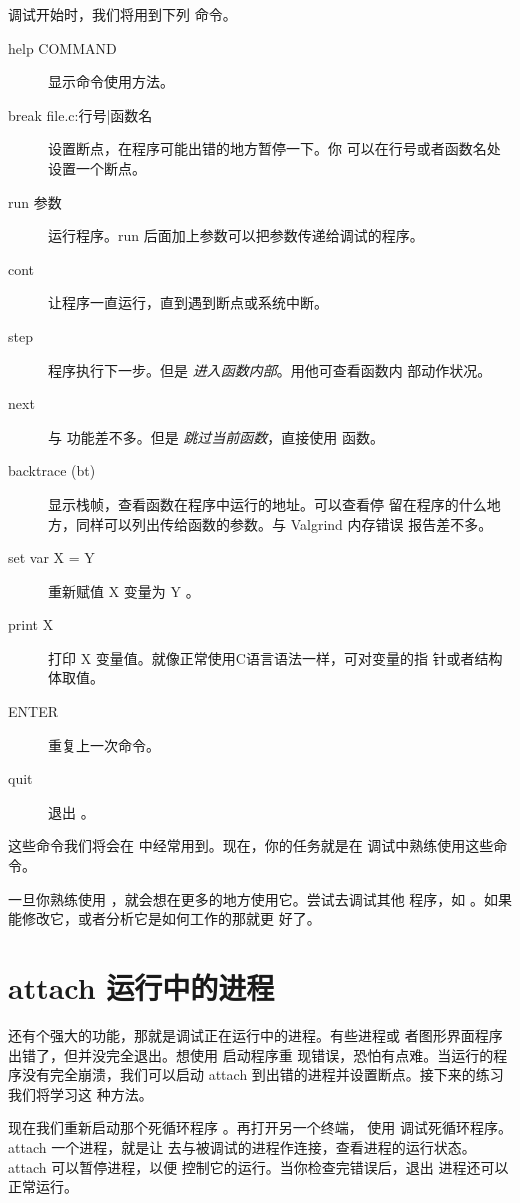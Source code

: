 \begin{enumerate}
调试开始时，我们将用到下列  命令。

\begin{description}
\item[help COMMAND] 显示命令使用方法。
\item[break file.c:行号|函数名] 设置断点，在程序可能出错的地方暂停一下。你
  可以在行号或者函数名处设置一个断点。
\item[run 参数] 运行程序。run 后面加上参数可以把参数传递给调试的程序。
\item[cont] 让程序一直运行，直到遇到断点或系统中断。
\item[step] 程序执行下一步。但是 \emph{进入函数内部}。用他可查看函数内
  部动作状况。
\item[next] 与  功能差不多。但是 \emph{跳过当前函数}，直接使用
  函数。
\item[backtrace (bt)] 显示栈帧，查看函数在程序中运行的地址。可以查看停
  留在程序的什么地方，同样可以列出传给函数的参数。与 Valgrind 内存错误
  报告差不多。
\item[set var X = Y] 重新赋值 X 变量为 Y 。
\item[print X] 打印 X 变量值。就像正常使用C语言语法一样，可对变量的指
  针或者结构体取值。
\item[ENTER] 重复上一次命令。
\item[quit] 退出 。
\end{description}


这些命令我们将会在  中经常用到。现在，你的任务就是在
 调试中熟练使用这些命令。


一旦你熟练使用 ，就会想在更多的地方使用它。尝试去调试其他
程序，如 。如果能修改它，或者分析它是如何工作的那就更
好了。

\section{attach 运行中的进程}

 还有个强大的功能，那就是调试正在运行中的进程。有些进程或
者图形界面程序出错了，但并没完全退出。想使用  启动程序重
现错误，恐怕有点难。当运行的程序没有完全崩溃，我们可以启动
 attach 到出错的进程并设置断点。接下来的练习我们将学习这
种方法。

现在我们重新启动那个死循环程序 。再打开另一个终端，
使用  调试死循环程序。attach 一个进程，就是让 
去与被调试的进程作连接，查看进程的运行状态。attach 可以暂停进程，以便
控制它的运行。当你检查完错误后，退出  进程还可以正常运行。


\end{enumerate}
